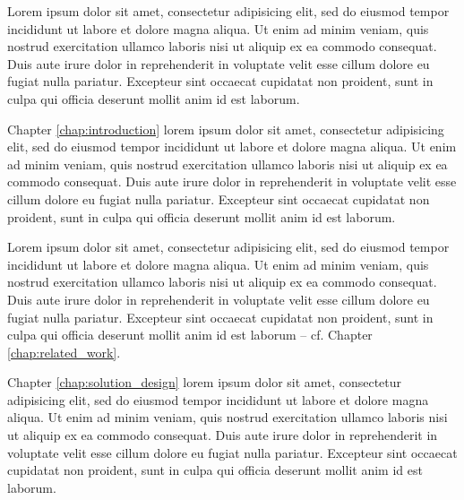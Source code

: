 Lorem ipsum dolor sit amet, consectetur adipisicing elit, sed do eiusmod tempor incididunt ut labore et dolore magna aliqua. Ut enim ad minim veniam, quis nostrud exercitation ullamco laboris nisi ut aliquip ex ea commodo consequat. Duis aute irure dolor in reprehenderit in voluptate velit esse cillum dolore eu fugiat nulla pariatur. Excepteur sint occaecat cupidatat non proident, sunt in culpa qui officia deserunt mollit anim id est laborum.

Chapter \ref{chap:introduction} lorem ipsum dolor sit amet, consectetur adipisicing elit, sed do eiusmod tempor incididunt ut labore et dolore magna aliqua. Ut enim ad minim veniam, quis nostrud exercitation ullamco laboris nisi ut aliquip ex ea commodo consequat. Duis aute irure dolor in reprehenderit in voluptate velit esse cillum dolore eu fugiat nulla pariatur. Excepteur sint occaecat cupidatat non proident, sunt in culpa qui officia deserunt mollit anim id est laborum.

Lorem ipsum dolor sit amet, consectetur adipisicing elit, sed do eiusmod tempor incididunt ut labore et dolore magna aliqua. Ut enim ad minim veniam, quis nostrud exercitation ullamco laboris nisi ut aliquip ex ea commodo consequat. Duis aute irure dolor in reprehenderit in voluptate velit esse cillum dolore eu fugiat nulla pariatur. Excepteur sint occaecat cupidatat non proident, sunt in culpa qui officia deserunt mollit anim id est laborum -- cf. Chapter \ref{chap:related_work}.

Chapter \ref{chap:solution_design} lorem ipsum dolor sit amet, consectetur adipisicing elit, sed do eiusmod tempor incididunt ut labore et dolore magna aliqua. Ut enim ad minim veniam, quis nostrud exercitation ullamco laboris nisi ut aliquip ex ea commodo consequat. Duis aute irure dolor in reprehenderit in voluptate velit esse cillum dolore eu fugiat nulla pariatur. Excepteur sint occaecat cupidatat non proident, sunt in culpa qui officia deserunt mollit anim id est laborum.
